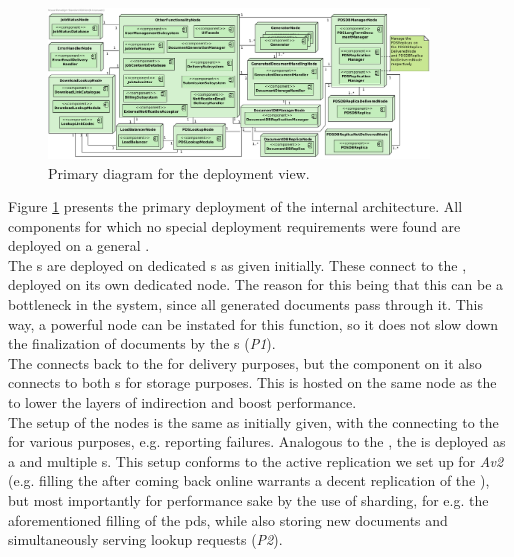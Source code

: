 \begin{figure}
    \centering
    \includegraphics[width=0.9\textwidth]{figures/Deployment.png}
    \caption{Primary diagram for the deployment view.}\label{fig:depl_primary}
\end{figure}


\noindent Figure \ref{fig:depl_primary} presents the primary deployment of the internal architecture. All components for which no special deployment requirements were found are deployed on a general .\\
The s are deployed on dedicated s as given initially. These connect to the , deployed on its own dedicated node. The reason for this being that this  can be a bottleneck in the system, since all generated documents pass through it. This way, a powerful node can be instated for this function, so it does not slow down the finalization of documents by the s (\emph{P1}).\\
The  connects back to the  for delivery purposes, but the  component on it also connects to both s for storage purposes. This  is hosted on the same node as the  to lower the layers of indirection and boost performance.\\
The setup of the  nodes is the same as initially given, with the  connecting to the  for various purposes, e.g. reporting  failures.
Analogous to the , the  is deployed as a  and multiple s. This setup conforms to the active replication we set up for \emph{Av2} (e.g. filling the  after coming back online warrants a decent replication of the ), but most importantly for performance sake by the use of sharding, for e.g. the aforementioned filling of the pds, while also storing new documents and simultaneously serving lookup requests (\emph{P2}).\\
